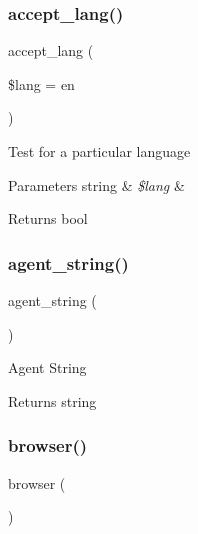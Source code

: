 \subsubsection{\texorpdfstring{accept\+\_\+lang()}{accept\_lang()}}
{\footnotesize\ttfamily accept\+\_\+lang (\begin{DoxyParamCaption}\item[{}]{\$lang = {\ttfamily \textquotesingle{}en\textquotesingle{}} }\end{DoxyParamCaption})}

Test for a particular language


\begin{DoxyParams}[1]{Parameters}
string & {\em \$lang} & \\
\hline
\end{DoxyParams}
\begin{DoxyReturn}{Returns}
bool 
\end{DoxyReturn}
\mbox{\label{class_c_i___user__agent_a2a75d1ec3cf3f59cdcae64f6afbc8a1b}} 
\subsubsection{\texorpdfstring{agent\+\_\+string()}{agent\_string()}}
{\footnotesize\ttfamily agent\+\_\+string (\begin{DoxyParamCaption}{ }\end{DoxyParamCaption})}

Agent String

\begin{DoxyReturn}{Returns}
string 
\end{DoxyReturn}
\mbox{\label{class_c_i___user__agent_a7dbfb19bfe0682921dcfad5de8dc987c}} 
\subsubsection{\texorpdfstring{browser()}{browser()}}
{\footnotesize\ttfamily browser (\begin{DoxyParamCaption}{ }\end{DoxyParamCaption})}

